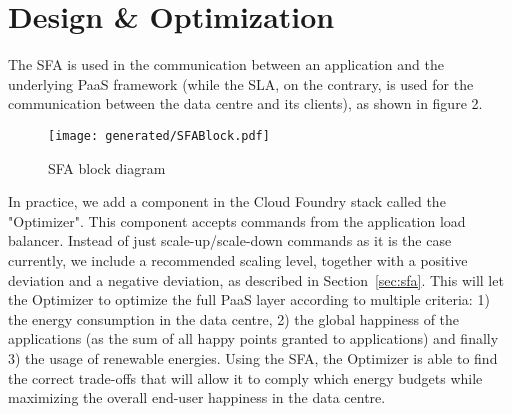 \section{Design \& Optimization}
\label{sec:implem}

The SFA is used in the communication between an application and the underlying PaaS framework (while the SLA, on the contrary, is used for the communication between the data centre and its clients), as shown in figure 2.

\begin{figure}[h]
\label{fig:SFABlock}
\centering
\texttt{[image: generated/SFABlock.pdf]}
\caption{SFA block diagram}
\end{figure}

In practice, we add a component in the Cloud Foundry stack called the "Optimizer".
This component accepts commands from the application load balancer.
Instead of just scale-up/scale-down commands as it is the case currently, we include a recommended scaling level, together with a positive deviation and a negative deviation, as described in Section~\ref{sec:sfa}.
This will let the Optimizer to optimize the full PaaS layer according to multiple criteria: 1) the energy consumption in the data centre, 2) the global happiness of the applications (as the sum of all happy points granted to applications) and finally 3) the usage of renewable energies.
Using the SFA, the Optimizer is able to find the correct trade-offs that will allow it to comply which energy budgets while maximizing the overall end-user happiness in the data centre.
